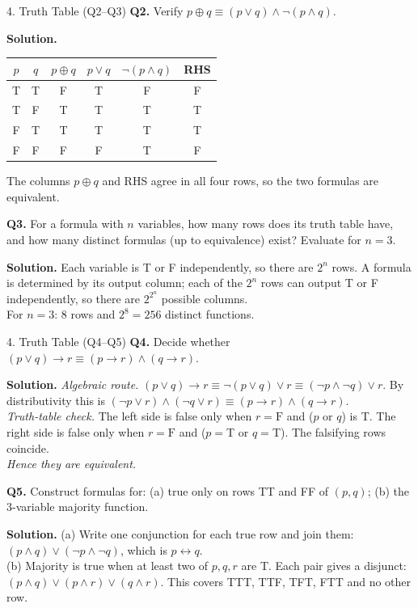 \documentclass[aspectratio=169,10pt]{beamer}
\newcommand{\qa}[3]{%
  \textbf{Q#1.} #2\par\smallskip
  {\color{ans}\textbf{Solution.} #3}\par\vspace{6pt}}
\begin{document}
\begin{frame}{4. Truth Table (Q2--Q3)}
\footnotesize
\qa{2}{Verify $p\oplus q\equiv(p\lor q)\land\neg(p\land q)$.}
{\centering
\begin{tabular}{cc|c|c|c|c}
\toprule
$p$&$q$&$p\oplus q$&$p\lor q$&$\neg(p\land q)$&RHS\\
\midrule
T&T&F&T&F&F\\
T&F&T&T&T&T\\
F&T&T&T&T&T\\
F&F&F&F&T&F\\
\bottomrule
\end{tabular}\par\smallskip
\raggedright The columns $p\oplus q$ and RHS agree in all four rows, so the two formulas are equivalent.}
\qa{3}{For a formula with $n$ variables, how many rows does its truth table have, and how many distinct formulas (up to equivalence) exist? Evaluate for $n=3$.}
{Each variable is T or F independently, so there are $2^n$ rows. A formula is determined by its output column; each of the $2^n$ rows can output T or F independently, so there are $2^{2^n}$ possible columns.\\
For $n=3$: $8$ rows and $2^8=256$ distinct functions.}
\end{frame}

\begin{frame}{4. Truth Table (Q4--Q5)}
\footnotesize
\qa{4}{Decide whether $(p\lor q)\to r\equiv(p\to r)\land(q\to r)$.}
{\emph{Algebraic route.} $(p\lor q)\to r\equiv\neg(p\lor q)\lor r\equiv(\neg p\land\neg q)\lor r$. By distributivity this is $(\neg p\lor r)\land(\neg q\lor r)\equiv(p\to r)\land(q\to r)$.\\
\emph{Truth-table check.} The left side is false only when $r=\mathrm{F}$ and ($p$ or $q$) is T. The right side is false only when $r=\mathrm{F}$ and ($p=$T or $q=$T). The falsifying rows coincide.\\
\emph{Hence they are equivalent.}}
\qa{5}{Construct formulas for: (a) true only on rows TT and FF of $(p,q)$; (b) the 3-variable majority function.}
{(a) Write one conjunction for each true row and join them: $(p\land q)\lor(\neg p\land\neg q)$, which is $p\leftrightarrow q$.\\
(b) Majority is true when at least two of $p,q,r$ are T. Each pair gives a disjunct: $(p\land q)\lor(p\land r)\lor(q\land r)$. This covers TTT, TTF, TFT, FTT and no other row.}
\end{frame}
\end{document}

